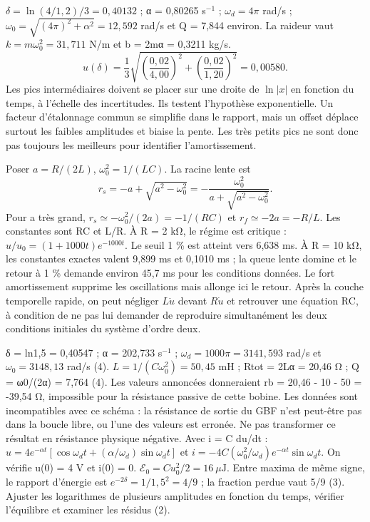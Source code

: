 $\delta=\ln(4/1{,}2)/3=0{,}40132$ ; α = 0,80265 s$^{-1}$ ; $\omega_d=4\pi$ rad/s ; $\omega_0=\sqrt{(4\pi)^2+\alpha^2}=12{,}592$ rad/s et Q = 7,844 environ.
La raideur vaut $k=m\omega_0^2=31{,}711$ N/m et b = 2mα = 0,3211 kg/s.
\[u(\delta)=\frac13\sqrt{\left(\frac{0{,}02}{4{,}00}\right)^2+\left(\frac{0{,}02}{1{,}20}\right)^2}=0{,}00580.\]
Les pics intermédiaires doivent se placer sur une droite de $\ln|x|$ en fonction du temps, à l’échelle des incertitudes. Ils testent l’hypothèse exponentielle. Un facteur d’étalonnage commun se simplifie dans le rapport, mais un offset déplace surtout les faibles amplitudes et biaise la pente. Les très petits pics ne sont donc pas toujours les meilleurs pour identifier l’amortissement.


Poser $a=R/(2L)$, $\omega_0^2=1/(LC)$. La racine lente est
\[r_s=-a+\sqrt{a^2-\omega_0^2}=-\frac{\omega_0^2}{a+\sqrt{a^2-\omega_0^2}}.\]
Pour a très grand, $r_s\simeq-\omega_0^2/(2a)=-1/(RC)$ et $r_f\simeq-2a=-R/L$. Les constantes sont RC et L/R.
À R = 2 kΩ, le régime est critique : $u/u_0=(1+1000t)e^{-1000t}$. Le seuil 1 \% est atteint vers 6,638 ms. À R = 10 kΩ, les constantes exactes valent 9,899 ms et 0,1010 ms ; la queue lente domine et le retour à 1 \% demande environ 45,7 ms pour les conditions données.
Le fort amortissement supprime les oscillations mais allonge ici le retour. Après la couche temporelle rapide, on peut négliger $L\ddot u$ devant $R\dot u$ et retrouver une équation RC, à condition de ne pas lui demander de reproduire simultanément les deux conditions initiales du système d’ordre deux.


δ = ln1,5 = 0,40547 ; α = 202,733 s$^{-1}$ ; $\omega_d=1000\pi=3141{,}593$ rad/s et $\omega_0=3148{,}13$ rad/s (4). $L=1/(C\omega_0^2)=50{,}45$ mH ; Rtot = 2Lα = 20,46 Ω ; Q = ω0/(2α) = 7,764 (4).
Les valeurs annoncées donneraient rb = 20,46 - 10 - 50 = -39,54 Ω, impossible pour la résistance passive de cette bobine. Les données sont incompatibles avec ce schéma : la résistance de sortie du GBF n’est peut-être pas dans la boucle libre, ou l’une des valeurs est erronée. Ne pas transformer ce résultat en résistance physique négative.
Avec i = C du/dt : $u=4e^{-\alpha t}[\cos\omega_dt+(\alpha/\omega_d)\sin\omega_dt]$ et $i=-4C(\omega_0^2/\omega_d)e^{-\alpha t}\sin\omega_dt$. On vérifie u(0) = 4 V et i(0) = 0.
$\mathcal E_0=Cu_0^2/2=16\ \mu\mathrm{ J}$. Entre maxima de même signe, le rapport d’énergie est $e^{-2\delta}=1/1{,}5^2=4/9$ ; la fraction perdue vaut 5/9 (3). Ajuster les logarithmes de plusieurs amplitudes en fonction du temps, vérifier l’équilibre et examiner les résidus (2).


